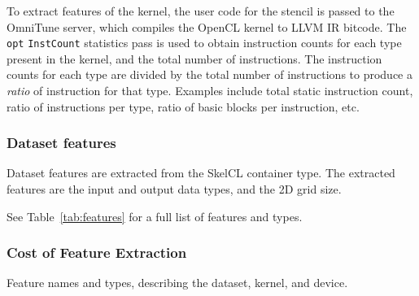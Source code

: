 To extract features of the kernel, the user code for the stencil is
passed to the OmniTune server, which compiles the OpenCL kernel to
LLVM IR bitcode. The \texttt{opt} \texttt{InstCount} statistics pass
is used to obtain instruction counts for each type present in the
kernel, and the total number of instructions. The instruction counts
for each type are divided by the total number of instructions to
produce a \emph{ratio} of instruction for that type. Examples include
total static instruction count, ratio of instructions per type, ratio
of basic blocks per instruction, etc.



\subsubsection{Dataset features}

Dataset features are extracted from the SkelCL container type. The
extracted features are the input and output data types, and the 2D
grid size.

See Table~\ref{tab:features} for a full list of features and
types.

\subsubsection{Cost of Feature Extraction}


\begin{table}

\caption{Feature names and types, describing the dataset, kernel,
  and device.}
\label{tab:features}
\end{table}


